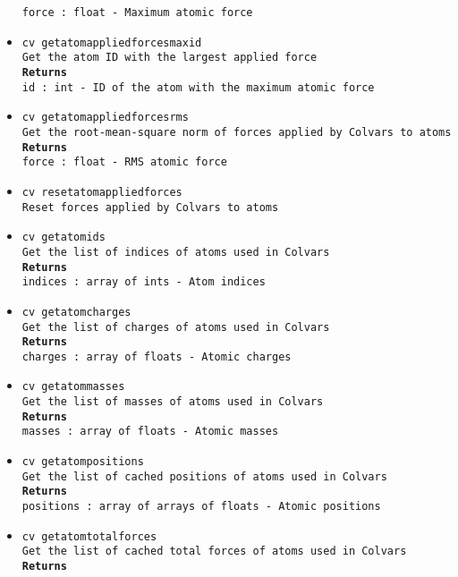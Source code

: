 \begin{itemize}
\texttt{force : float - Maximum atomic force}
\item \texttt{cv getatomappliedforcesmaxid}
\\
\texttt{Get the atom ID with the largest applied force}
\\
\texttt{\textbf{Returns}}
\\
\texttt{id : int - ID of the atom with the maximum atomic force}
\item \texttt{cv getatomappliedforcesrms}
\\
\texttt{Get the root-mean-square norm of forces applied by Colvars to atoms}
\\
\texttt{\textbf{Returns}}
\\
\texttt{force : float - RMS atomic force}
\item \texttt{cv resetatomappliedforces}
\\
\texttt{Reset forces applied by Colvars to atoms}
\item \texttt{cv getatomids}
\\
\texttt{Get the list of indices of atoms used in Colvars}
\\
\texttt{\textbf{Returns}}
\\
\texttt{indices : array of ints - Atom indices}
\item \texttt{cv getatomcharges}
\\
\texttt{Get the list of charges of atoms used in Colvars}
\\
\texttt{\textbf{Returns}}
\\
\texttt{charges : array of floats - Atomic charges}
\item \texttt{cv getatommasses}
\\
\texttt{Get the list of masses of atoms used in Colvars}
\\
\texttt{\textbf{Returns}}
\\
\texttt{masses : array of floats - Atomic masses}
\item \texttt{cv getatompositions}
\\
\texttt{Get the list of cached positions of atoms used in Colvars}
\\
\texttt{\textbf{Returns}}
\\
\texttt{positions : array of arrays of floats - Atomic positions}
\item \texttt{cv getatomtotalforces}
\\
\texttt{Get the list of cached total forces of atoms used in Colvars}
\\
\texttt{\textbf{Returns}}
\\

\end{itemize}
